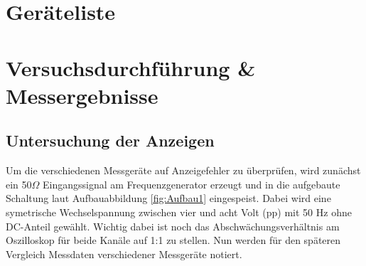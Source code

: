 \documentclass[12pt,a4paper,twoside]{article}
\begin{document}
\section{Geräteliste} %

    \begin{table}[H]
        \centering
        \caption{Im Versuch verwendete Geräte und Utensilien.}
        \label{tab:geraete}
    \end{table}


\section{Versuchsdurchführung \& Messergebnisse} %


\subsection{Untersuchung der Anzeigen}

Um die verschiedenen Messgeräte auf Anzeigefehler zu überprüfen, wird zunächst ein 50$\Omega$ Eingangssignal am Frequenzgenerator erzeugt und in die aufgebaute Schaltung laut Aufbauabbildung \ref{fig:Aufbau1} eingespeist.
Dabei wird eine symetrische Wechselspannung zwischen vier und acht Volt (pp) mit 50 Hz ohne DC-Anteil gewählt. Wichtig dabei ist noch das Abschwächungsverhältnis am Oszilloskop für beide Kanäle auf 1:1 zu stellen. Nun werden für den späteren Vergleich Messdaten verschiedener Messgeräte notiert.
\end{document}
